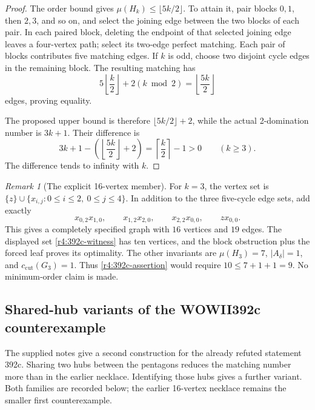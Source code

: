 \documentclass[11pt,a4paper]{article}
\theoremstyle{remark}
\newtheorem{remark}[theorem]{Remark}
\begin{document}
\begin{proof}
The order bound gives $\mu(H_k)\le\lfloor5k/2\rfloor$.  To attain it,
pair blocks $0,1$, then $2,3$, and so on, and select the joining edge
between the two blocks of each pair.  In each paired block, deleting
the endpoint of that selected joining edge leaves a four-vertex path;
select its two-edge perfect matching.  Each pair of blocks contributes
five matching edges.  If $k$ is odd, choose two disjoint cycle edges
in the remaining block.  The resulting matching has
\[
  5\left\lfloor\frac k2\right\rfloor+2(k\bmod2)
  =\left\lfloor\frac{5k}{2}\right\rfloor
\]
edges, proving equality.

The proposed upper bound is therefore $\lfloor5k/2\rfloor+2$, while
the actual 2-domination number is $3k+1$.  Their difference is
\[
  3k+1-\left(\left\lfloor\frac{5k}{2}\right\rfloor+2\right)
  =\left\lceil\frac k2\right\rceil-1>0
  \qquad(k\ge3).
\]
The difference tends to infinity with $k$.
\end{proof}

\begin{remark}[The explicit 16-vertex member]
\label{r4:392c-finite}
For $k=3$, the vertex set is
$\{z\}\cup\{x_{i,j}:0\le i\le2,\ 0\le j\le4\}$.
In addition to the three five-cycle edge sets, add exactly
\[
  x_{0,2}x_{1,0},\qquad x_{1,2}x_{2,0},\qquad
  x_{2,2}x_{0,0},\qquad zx_{0,0}.
\]
This gives a completely specified graph with $16$ vertices and $19$
edges.  The displayed set \eqref{r4:392c-witness} has ten vertices,
and the block obstruction plus the forced leaf proves its optimality.
The other invariants are $\mu(H_3)=7$, $|A_\delta|=1$, and
$c_{\mathrm{cut}}(G_3)=1$.  Thus \eqref{r4:392c-assertion} would require
$10\le7+1+1=9$.  No minimum-order claim is made.
\end{remark}



\subsection{Shared-hub variants of the WOWII392c counterexample}
\label{r7:392c}

The supplied notes give a second construction for the already refuted
statement 392c. Sharing two hubs between the pentagons reduces the
matching number more than in the earlier necklace. Identifying those
hubs gives a further variant. Both families are recorded below; the
earlier 16-vertex necklace remains the smaller first counterexample.
\end{document}
